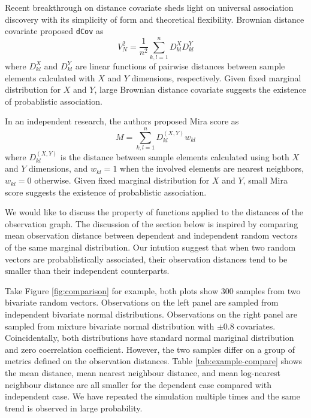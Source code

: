\documentclass{sig-alternate}
\begin{document}
Recent breakthrough on distance covariate \cite{székely2009,
  székely2007} sheds light on universal association discovery with
its simplicity of form and theoretical flexibility. Brownian distance
\cite{székely2009} covariate proposed \texttt{dCov} as
\begin{equation*}
  V_N^2 = \frac{1}{n^2}\sum_{k,l=1}^n D^{X}_{kl}D^{Y}_{kl}
\end{equation*}
where $D^{X}_{kl}$ and $D^{Y}_{kl}$ are linear functions of pairwise
distances between sample elements calculated with $X$ and $Y$
dimensions, respectively. Given fixed marginal distribution for $X$
and $Y$, large Brownian distance covariate suggests the existence of
probablistic association.

In an independent research, the authors proposed Mira score
\cite{my-dissertation} as
\begin{equation*}
  M = \sum_{k,l = 1}^n D^{(X,Y)}_{kl} w_{kl}
\end{equation*}
where $D^{(X,Y)}_{kl}$ is the distance between sample elements
calculated using both $X$ and $Y$ dimensions, and $w_{kl}=1$ when the
involved elements are nearest neighbors, $w_{kl}=0$ otherwise. Given
fixed marginal distribution for $X$ and $Y$, small Mira score suggests
the existence of probablistic association. 

We would like to discuss the property of functions applied to the
distances of the observation graph. The discussion of the section
below is inspired by comparing mean observation distance between
dependent and independent random vectors of the same marginal
distribution. Our intution suggest that when two random vectors are
probablistically associated, their observation distances tend to be
smaller than their independent counterparts.

Take Figure \ref{fig:comparison} for example, both plots show 300
samples from two bivariate random vectors. Observations on the left
panel are sampled from independent bivariate normal distributions.
Observations on the right panel are sampled from mixture bivariate
normal distribution with $\pm 0.8$ covariates. Coincidentally, both
distributions have standard normal mariginal distribution and zero
coerrelation coefficient. However, the two samples differ on a group
of metrics defined on the observation distances. Table
\ref{tab:example-compare} shows the mean distance, mean nearest
neighbour distance, and mean log-nearest neighbour distance are all
smaller for the dependent case compared with independent case. We have
repeated the simulation multiple times and the same trend is observed
in large probability.
\end{document}
